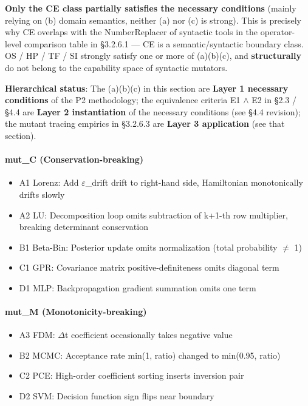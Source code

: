 \documentclass[review,12pt,authoryear]{elsarticle}
\providecommand{\tightlist}{\setlength{\itemsep}{0pt}\setlength{\parskip}{0pt}}
\begin{document}
\textbf{Only the CE class partially satisfies the necessary conditions}
(mainly relying on (b) domain semantics, neither (a) nor (c) is strong).
This is precisely why CE overlaps with the NumberReplacer of syntactic
tools in the operator-level comparison table in §3.2.6.1 --- CE is a
semantic/syntactic boundary class. OS / HP / TF / SI strongly satisfy
one or more of (a)(b)(c), and \textbf{structurally} do not belong to the
capability space of syntactic mutators.

\textbf{Hierarchical status}: The (a)(b)(c) in this section are
\textbf{Layer 1 necessary conditions} of the P2 methodology; the
equivalence criteria E1 $\wedge$ E2 in §2.3 / §4.4 are \textbf{Layer 2
instantiation} of the necessary conditions (see §4.4 revision); the
mutant tracing empirics in §3.2.6.3 are \textbf{Layer 3 application}
(see that section).

\paragraph{mut\_C
(Conservation-breaking)}\label{mut_c-conservation-breaking}

\begin{itemize}
\tightlist
\item
  A1 Lorenz: Add $\varepsilon$\_drift drift to right-hand side, Hamiltonian
  monotonically drifts slowly
\item
  A2 LU: Decomposition loop omits subtraction of k+1-th row multiplier,
  breaking determinant conservation
\item
  B1 Beta-Bin: Posterior update omits normalization (total probability $\neq$
  1)
\item
  C1 GPR: Covariance matrix positive-definiteness omits diagonal term
\item
  D1 MLP: Backpropagation gradient summation omits one term
\end{itemize}

\paragraph{mut\_M
(Monotonicity-breaking)}\label{mut_m-monotonicity-breaking}

\begin{itemize}
\tightlist
\item
  A3 FDM: $\Delta$t coefficient occasionally takes negative value
\item
  B2 MCMC: Acceptance rate min(1, ratio) changed to min(0.95, ratio)
\item
  C2 PCE: High-order coefficient sorting inserts inversion pair
\item
  D2 SVM: Decision function sign flips near boundary
\end{itemize}
\end{document}
